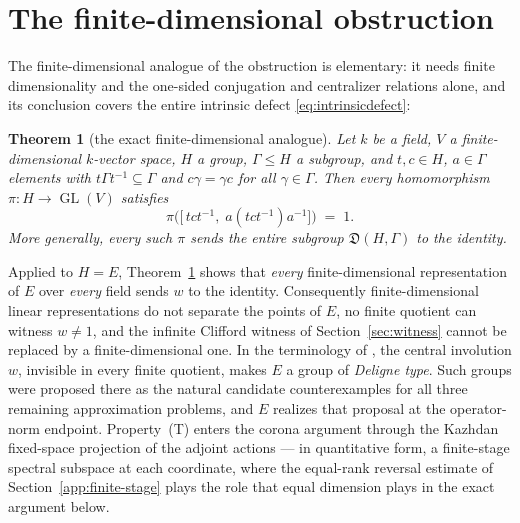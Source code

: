 \documentclass[11pt]{amsart}
\newcommand{\leanverified}[2]{\ignorespaces}
\newtheorem{theorem}{Theorem}[section]
\theoremstyle{definition}
\theoremstyle{remark}
\theoremstyle{plain}
\newcommand{\GL}{\operatorname{GL}}
\begin{document}
\section{The finite-dimensional obstruction}\label{sec:findim}

The finite-dimensional analogue of the obstruction is elementary: it
needs finite dimensionality and the one-sided conjugation and
centralizer relations alone, and its conclusion covers the entire
intrinsic defect \eqref{eq:intrinsicdefect}:

\begin{theorem}[the exact finite-dimensional analogue]\label{thm:B}
Let $k$ be a field, $V$ a finite-dimensional $k$-vector space, $H$ a
group, $\Gamma\le H$ a subgroup, and $t,c\in H$, $a\in\Gamma$ elements
with $t\Gamma t^{-1}\subseteq\Gamma$ and $c\gamma=\gamma c$ for all
$\gamma\in\Gamma$.  Then every homomorphism $\pi\colon H\to\GL(V)$
satisfies
\[
  \pi\bigl(\bigl[\,tct^{-1},\;a(tct^{-1})a^{-1}\bigr]\bigr)\;=\;1 .
\]
More generally, every such $\pi$ sends the entire subgroup
$\mathfrak D(H,\Gamma)$ to the identity.
\leanverified{Sofic/ManuscriptExactWrappers}{GroupApproximation.ManuscriptExactWrappers.manuscriptTheoremB}
\end{theorem}

Applied to $H=E$, Theorem~\ref{thm:B} shows that \emph{every}
finite-dimensional representation of $E$ over \emph{every} field sends
$w$ to the identity.  Consequently finite-dimensional linear
representations do not separate the points of $E$, no finite quotient
can witness $w\neq 1$, and the infinite Clifford witness of
Section~\ref{sec:witness} cannot be replaced by a finite-dimensional
one.  In the terminology of \cite[Definition~1.2]{BDL}, the central
involution $w$, invisible in every finite quotient, makes $E$ a group
of \emph{Deligne type}.  Such groups were proposed there as the
natural candidate counterexamples for all three remaining
approximation problems, and $E$ realizes that proposal at the
operator-norm endpoint.
Property~\textup{(T)} enters the corona argument through the Kazhdan
fixed-space projection of the adjoint actions --- in quantitative form,
a finite-stage spectral subspace at each coordinate, where the
equal-rank reversal estimate of Section~\ref{app:finite-stage} plays
the role that equal dimension plays in the exact argument below.
\end{document}
